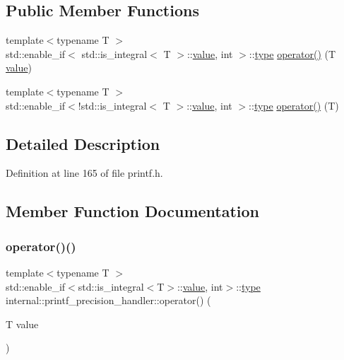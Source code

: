 \subsection*{Public Member Functions}
\begin{DoxyCompactItemize}
\item 
{\footnotesize template$<$typename T $>$ }\\std\+::enable\+\_\+if$<$ std\+::is\+\_\+integral$<$ T $>$\+::\hyperlink{classinternal_1_1value}{value}, int $>$\+::\hyperlink{namespaceinternal_a8661864098ac0acff9a6dd7e66f59038}{type} \hyperlink{classinternal_1_1printf__precision__handler_a0f1c9fb4753483ef7428327941539eea}{operator()} (T \hyperlink{classinternal_1_1value}{value})
\item 
{\footnotesize template$<$typename T $>$ }\\std\+::enable\+\_\+if$<$!std\+::is\+\_\+integral$<$ T $>$\+::\hyperlink{classinternal_1_1value}{value}, int $>$\+::\hyperlink{namespaceinternal_a8661864098ac0acff9a6dd7e66f59038}{type} \hyperlink{classinternal_1_1printf__precision__handler_a59e46032e62563502408aa81b2ca7bdd}{operator()} (T)
\end{DoxyCompactItemize}


\subsection{Detailed Description}


Definition at line 165 of file printf.\+h.



\subsection{Member Function Documentation}
\mbox{\label{classinternal_1_1printf__precision__handler_a0f1c9fb4753483ef7428327941539eea}} 
\subsubsection{\texorpdfstring{operator()()}{operator()()}\hspace{0.1cm}{\footnotesize\ttfamily [1/2]}}
{\footnotesize\ttfamily template$<$typename T $>$ \\
std\+::enable\+\_\+if$<$std\+::is\+\_\+integral$<$T$>$\+::\hyperlink{classinternal_1_1value}{value}, int$>$\+::\hyperlink{namespaceinternal_a8661864098ac0acff9a6dd7e66f59038}{type} internal\+::printf\+\_\+precision\+\_\+handler\+::operator() (\begin{DoxyParamCaption}\item[{T}]{value }\end{DoxyParamCaption})\hspace{0.3cm}{\ttfamily [inline]}}



